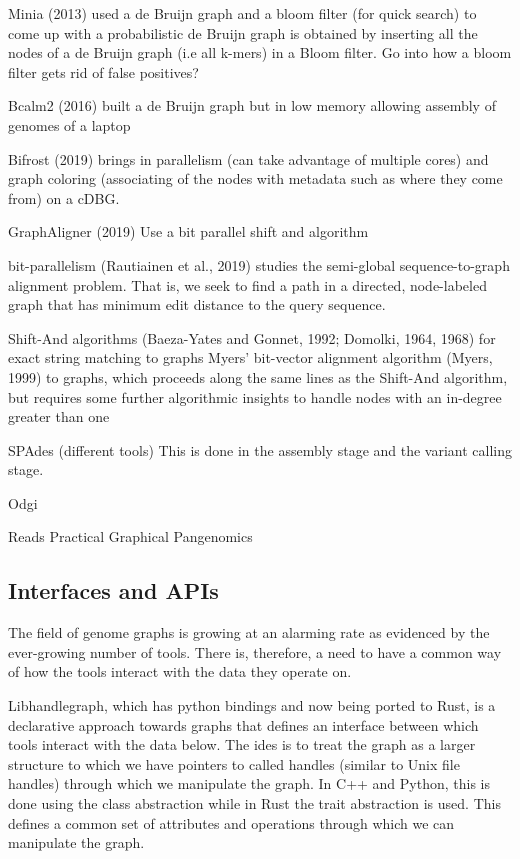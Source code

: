 \documentclass[11pt]{article}
\begin{document}
Minia (2013) used a de Bruijn graph and a bloom filter (for quick search) to come up with a probabilistic de Bruijn graph is obtained by inserting all the nodes of a de Bruijn graph (i.e all k-mers) in a Bloom filter.
Go into how a bloom filter gets rid of false positives?

Bcalm2 (2016) built a de Bruijn graph but in low memory allowing assembly of genomes of a laptop

Bifrost (2019) brings in parallelism (can take advantage of multiple cores) and graph coloring (associating of the nodes with metadata such as where they come from) on a cDBG.

GraphAligner (2019) 
Use a bit parallel shift and algorithm

bit-parallelism
(Rautiainen et al., 2019)  studies the semi-global sequence-to-graph alignment problem. That is, we seek to find a path in a directed, node-labeled graph that has minimum edit distance to the query sequence.

Shift-And algorithms (Baeza-Yates and Gonnet, 1992; Domolki, 1964, 1968) for exact string matching to graphs
Myers’ bit-vector alignment algorithm (Myers, 1999) to graphs, which proceeds along the same lines as the Shift-And algorithm, but requires some further algorithmic insights to handle nodes with an in-degree greater than one

SPAdes (different tools)
This is done in the assembly stage and the variant calling stage. 

Odgi

Reads
Practical Graphical Pangenomics
\subsection{Interfaces and APIs}
\label{sec:orga8d3c6e}
The field of genome graphs is growing at an alarming rate as evidenced by the ever-growing number of tools.
There is, therefore, a need to have a common way of how the tools interact with the data they operate on.

Libhandlegraph, which has python bindings and now being ported to Rust, is a declarative approach towards graphs that defines an interface between which tools interact with the data below. The ides is to treat the graph as a larger structure to which we have pointers to called handles (similar to Unix file handles) through which we manipulate the graph. In C++ and Python, this is done using the class abstraction while in Rust the trait abstraction is used.
This defines a common set of attributes and operations through which we can manipulate the graph. 
\end{document}
